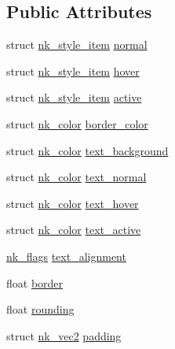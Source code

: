 \subsection*{Public Attributes}
\begin{DoxyCompactItemize}
\item 
struct \mbox{\hyperlink{structnk__style__item}{nk\+\_\+style\+\_\+item}} \mbox{\hyperlink{structnk__style__button_a61dc3620dafc66cc38eeafca37a4b248}{normal}}
\item 
struct \mbox{\hyperlink{structnk__style__item}{nk\+\_\+style\+\_\+item}} \mbox{\hyperlink{structnk__style__button_a79019a05062f31a26cee5270f31a1c92}{hover}}
\item 
struct \mbox{\hyperlink{structnk__style__item}{nk\+\_\+style\+\_\+item}} \mbox{\hyperlink{structnk__style__button_a69e536c30da388a84eed8f605e860129}{active}}
\item 
struct \mbox{\hyperlink{structnk__color}{nk\+\_\+color}} \mbox{\hyperlink{structnk__style__button_aa89ff1863884006ea538cf4f5be8780a}{border\+\_\+color}}
\item 
struct \mbox{\hyperlink{structnk__color}{nk\+\_\+color}} \mbox{\hyperlink{structnk__style__button_a043c53b3664b19ad638c3e4aade0cb78}{text\+\_\+background}}
\item 
struct \mbox{\hyperlink{structnk__color}{nk\+\_\+color}} \mbox{\hyperlink{structnk__style__button_a70eabd8d45ca4dc60c0753c75b3b1b25}{text\+\_\+normal}}
\item 
struct \mbox{\hyperlink{structnk__color}{nk\+\_\+color}} \mbox{\hyperlink{structnk__style__button_a7e9e7511d72f41d83dccbb9af9b5dd33}{text\+\_\+hover}}
\item 
struct \mbox{\hyperlink{structnk__color}{nk\+\_\+color}} \mbox{\hyperlink{structnk__style__button_a20188ac9f2d9353b770875ee1610126d}{text\+\_\+active}}
\item 
\mbox{\hyperlink{nuklear_8h_a19e0e2f6db4862891d9801de3c3da323}{nk\+\_\+flags}} \mbox{\hyperlink{structnk__style__button_a3d8e4dc9e256e06ac66d9790403c79e4}{text\+\_\+alignment}}
\item 
float \mbox{\hyperlink{structnk__style__button_a1f6e003617c76e6d7012ad4a64671303}{border}}
\item 
float \mbox{\hyperlink{structnk__style__button_ae1d141c0c8d52167d779fb4173b2da6b}{rounding}}
\item 
struct \mbox{\hyperlink{structnk__vec2}{nk\+\_\+vec2}} \mbox{\hyperlink{structnk__style__button_a415445397a06f67cfe32516aeaac3683}{padding}}
\item 

\end{DoxyCompactItemize}
